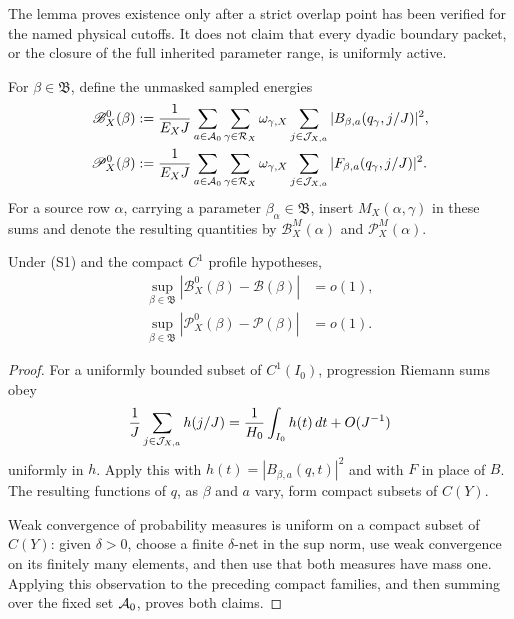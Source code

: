 The lemma proves existence only after a strict overlap point has been
verified for the named physical cutoffs.  It does not claim that every
dyadic boundary packet, or the closure of the full inherited parameter
range, is uniformly active.

For \(\beta\in\mathfrak B\), define the unmasked sampled energies
\begin{align}
 \mathscr B_X^0(\beta)
 &:=\frac1{E_XJ}\sum_{a\in\mathcal A_0}
   \sum_{\gamma\in\mathcal R_X}\omega_{\gamma,X}
   \sum_{j\in\mathcal J_{X,a}}
   |B_{\beta,a}(q_\gamma,j/J)|^2,
 \label{eq:tpc52-unmasked-carrier-sample}\\
 \mathscr P_X^0(\beta)
 &:=\frac1{E_XJ}\sum_{a\in\mathcal A_0}
   \sum_{\gamma\in\mathcal R_X}\omega_{\gamma,X}
   \sum_{j\in\mathcal J_{X,a}}
   |F_{\beta,a}(q_\gamma,j/J)|^2.
 \label{eq:tpc52-unmasked-profile-sample}
\end{align}
For a source row \(\alpha\), carrying a parameter
\(\beta_\alpha\in\mathfrak B\), insert
\(M_X(\alpha,\gamma)\) in these sums and denote the resulting quantities by
\(\mathscr B_X^M(\alpha)\) and \(\mathscr P_X^M(\alpha)\).

\begin{lemma}
\label{lem:tpc52-uniform-row-orbit-sampling}
Under \textup{(S1)} and the compact \(C^1\) profile hypotheses,
\begin{align}
 \sup_{\beta\in\mathfrak B}
 |\mathscr B_X^0(\beta)-\mathscr B(\beta)|&=o(1),
 \label{eq:tpc52-uniform-carrier-sampling}\\
 \sup_{\beta\in\mathfrak B}
 |\mathscr P_X^0(\beta)-\mathscr P(\beta)|&=o(1).
 \label{eq:tpc52-uniform-profile-sampling}
\end{align}
\end{lemma}

\begin{proof}
For a uniformly bounded subset of \(C^1(I_0)\), progression Riemann sums
obey
\[
 \frac1J\sum_{j\in\mathcal J_{X,a}}
 h(j/J)
 =\frac1{H_0}\int_{I_0}h(t)\,dt+O(J^{-1})
\]
uniformly in \(h\).  Apply this with
\(h(t)=|B_{\beta,a}(q,t)|^2\) and with \(F\) in place of \(B\).  The
resulting functions of \(q\), as \(\beta\) and \(a\) vary, form compact
subsets of \(C(Y)\).

Weak convergence of probability measures is uniform on a compact subset of
\(C(Y)\): given \(\delta>0\), choose a finite \(\delta\)-net in the sup norm,
use weak convergence on its finitely many elements, and then use that both
measures have mass one.  Applying this observation to the preceding compact
families, and then summing over the fixed set \(\mathcal A_0\), proves both claims.
\end{proof}

